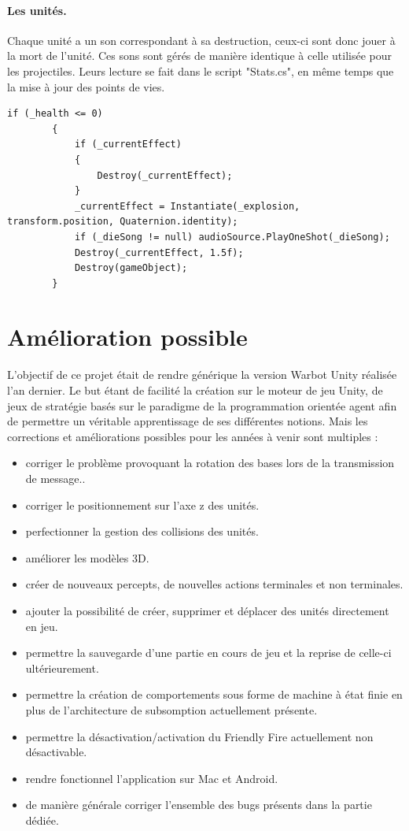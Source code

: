 \documentclass{report}
\begin{document}
\paragraph{Les unités.}
Chaque unité a un son correspondant à sa destruction, ceux-ci sont donc jouer à la mort de l'unité. Ces sons sont gérés de manière identique à celle utilisée pour les projectiles. Leurs lecture se fait dans le script "Stats.cs", en même temps que la mise à jour des points de vies. 
\begin{lstlisting}[language={[Sharp]C},label={lst:bulletAudio}, caption= Extrait du code de Stats.cs ]
if (_health <= 0)
        {
            if (_currentEffect)
            {
                Destroy(_currentEffect);
            }
            _currentEffect = Instantiate(_explosion, transform.position, Quaternion.identity);
            if (_dieSong != null) audioSource.PlayOneShot(_dieSong);
            Destroy(_currentEffect, 1.5f);
            Destroy(gameObject);
        }
\end{lstlisting}
\section{Amélioration possible}
L’objectif de ce projet était de rendre générique la version Warbot Unity réalisée l'an dernier.
Le but étant de facilité la création sur le moteur de jeu Unity, de jeux de stratégie basés sur le paradigme de  la programmation orientée agent afin de permettre un véritable apprentissage de ses différentes notions. Mais les corrections et améliorations possibles pour les années à
venir sont multiples :
\begin{itemize}
\item corriger le problème provoquant la rotation des bases lors de la transmission de message..
\item corriger le positionnement sur l'axe z des unités.
\item perfectionner la gestion des collisions des unités.
\item améliorer les modèles 3D.
\item créer de nouveaux percepts, de nouvelles actions terminales et non terminales.
\item ajouter la possibilité de créer, supprimer et déplacer des unités directement en jeu.
\item permettre la sauvegarde d'une partie en cours de jeu et la reprise de celle-ci ultérieurement.
\item permettre la création de comportements sous forme de machine à état finie en plus de l'architecture de subsomption actuellement présente.
\item permettre la désactivation/activation du Friendly Fire actuellement non désactivable.
\item rendre fonctionnel l'application sur Mac et Android.
\item de manière générale corriger l'ensemble des bugs présents dans la partie dédiée.
\end{itemize}
\end{document}
